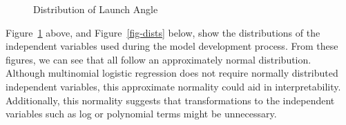 \documentclass[
  letterpaper,
  DIV=11,
  numbers=noendperiod]{scrartcl}
\begin{document}
\begin{figure}[H]


\caption{\label{fig-launch-angle}Distribution of Launch Angle}

\end{figure}%

Figure~\ref{fig-launch-angle} above, and Figure~\ref{fig-dists} below,
show the distributions of the independent variables used during the
model development process. From these figures, we can see that all
follow an approximately normal distribution. Although multinomial
logistic regression does not require normally distributed independent
variables, this approximate normality could aid in interpretability.
Additionally, this normality suggests that transformations to the
independent variables such as log or polynomial terms might be
unnecessary.
\end{document}
